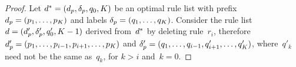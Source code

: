 \begin{proof}

Let ${d^* = (d_p, \delta_p, q_0, K)}$ be an optimal
rule list with prefix ${d_p = (p_1, \dots, p_K)}$
and labels ${\delta_p = (q_1, \dots, q_K)}$.
%
Consider the rule list ${{d} =  (d_p', \delta_p', q_0', K-1)}$
derived from~$d^*$ by deleting rule~$r_i$,
therefore ${d_p' = (p_1, \dots, p_{i-1}, p_{i+1}, \dots, p_K)}$
and ${\delta_p' = (q_1, \dots, q_{i-1}, q'_{i+1}, \dots, q'_K)}$,
where~$q'_k$ need not be the same as~$q_k$, for ${k > i}$ and~${k = 0}$.
%


\end{proof}
